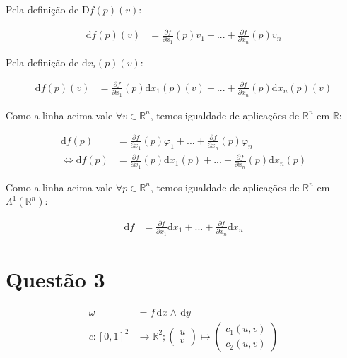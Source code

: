 \documentclass[12pt,a4paper]{article}
\begin{document}
		Pela defini\c{c}\~ao de D$f(p)(v)$:

		\begin{align}
			\mathrm{d}f(p)(v) &= \frac{\partial f}{\partial x_1} (p) v_1 + ... + \frac{\partial f}{\partial x_n} (p) v_n
		\end{align}

		Pela defini\c{c}\~ao de d$x_i(p)(v)$:

		\begin{align}
			\mathrm{d}f(p)(v) &= \frac{\partial f}{\partial x_1} (p) \mathrm{d}x_1 (p) (v) + ... + \frac{\partial f}{\partial x_n} (p) \mathrm{d}x_n (p) (v)
		\end{align}

		Como a linha acima vale $\forall v \in \mathbb{R}^n$, temos igualdade de aplica\c{c}\~oes de $\mathbb{R}^n$ em $\mathbb{R}$:

		\begin{align}
			\mathrm{d}f(p) &= \frac{\partial f}{\partial x_1} (p) \varphi_1 + ... + \frac{\partial f}{\partial x_n} (p) \varphi_n \\
			\Leftrightarrow \mathrm{d}f(p) &= \frac{\partial f}{\partial x_1} (p) \mathrm{d}x_1 (p) + ... + \frac{\partial f}{\partial x_n} (p) \mathrm{d}x_n (p)
		\end{align}

		Como a linha acima vale $\forall p \in \mathbb{R}^n$, temos igualdade de aplica\c{c}\~oes de $\mathbb{R}^n$ em $\Lambda^1(\mathbb{R}^n)$:

		\begin{align}
			\mathrm{d}f &= \frac{\partial f}{\partial x_1} \mathrm{d}x_1 + ... + \frac{\partial f}{\partial x_n} \mathrm{d}x_n
		\end{align}

	\section{Quest\~ao 3}

		\begin{align}
			\omega &= f \,\mathrm{d}x \wedge \,\mathrm{d}y \\
			c : [0,1]^2 &\rightarrow \mathbb{R}^2 ; \begin{pmatrix} u \\ v \end{pmatrix} \mapsto \begin{pmatrix} c_1(u,v) \\ c_2(u,v) \end{pmatrix}
		\end{align}
\end{document}
